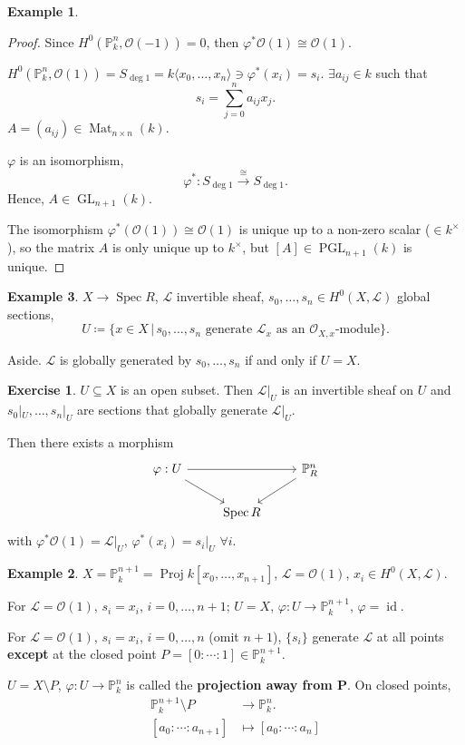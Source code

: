 \documentclass[12pt]{article}
\DeclareMathOperator{\id}{id}
\DeclareMathOperator{\Spec}{Spec}
\DeclareMathOperator{\Proj}{Proj}
\DeclareMathOperator{\GL}{GL}
\DeclareMathOperator{\PGL}{PGL}
\DeclareMathOperator{\Mat}{Mat}
\theoremstyle{definition}
\newtheorem*{exercise}{Exercise}
\newtheorem*{example}{Example}
\theoremstyle{remark}
\begin{document}
\begin{example}
\begin{proof}
Since $H^0(\mathbb{P}_k^n,\mathcal{O}(-1))=0$, then $\varphi^*\mathcal{O}(1)\cong\mathcal{O}(1)$.

$H^0(\mathbb{P}_k^n,\mathcal{O}(1))=S_{\deg1}=k\langle x_0,\ldots,x_n\rangle\ni\varphi^*(x_i)=s_i$. $\exists a_{ij}\in k$ such that
\[s_i=\sum_{j=0}^na_{ij}x_j.\]
$A=(a_{ij})\in\Mat_{n\times n}(k)$.

$\varphi$ is an isomorphism,
\[\varphi^*:S_{\deg1}\overset{\cong}{\longrightarrow}S_{\deg1}.\]
Hence, $A\in\GL_{n+1}(k)$.

The isomorphism $\varphi^*(\mathcal{O}(1))\cong\mathcal{O}(1)$ is unique up to a non-zero scalar ($\in k^{\times}$), so the matrix $A$ is only unique up to $k^{\times}$, but $[A]\in\PGL_{n+1}(k)$ is unique.
\end{proof}
\end{example}

\begin{example}
$X\rightarrow\Spec R$, $\mathcal{L}$ invertible sheaf, $s_0,\ldots,s_n\in H^0(X,\mathcal{L})$ global sections,
\[U\coloneqq\{x\in X\,|\,s_0,\ldots,s_n\text{ generate }\mathcal{L}_x\text{ as an }\mathcal{O}_{X,x}\text{-module}\}.\]

Aside. $\mathcal{L}$ is globally generated by $s_0,\ldots,s_n$ if and only if $U=X$.

\begin{exercise}
$U\subseteq X$ is an open subset. Then $\mathcal{L}|_U$ is an invertible sheaf on $U$ and $s_0|_U,\ldots,s_n|_U$ are sections that globally generate $\mathcal{L}|_U$.

Then there exists a morphism
\[
\begin{tikzcd}
\varphi:U\arrow[rr]\arrow[rd]&&\mathbb{P}_R^n\arrow[ld]\\
&\Spec R
\end{tikzcd}
\]
with $\varphi^*\mathcal{O}(1)=\mathcal{L}|_U$, $\varphi^*(x_i)=s_i|_U$ $\forall i$.
\end{exercise}

\begin{example}
$X=\mathbb{P}_k^{n+1}=\Proj k[x_0,\ldots,x_{n+1}]$, $\mathcal{L}=\mathcal{O}(1)$, $x_i\in H^0(X,\mathcal{L})$.

For $\mathcal{L}=\mathcal{O}(1)$, $s_i=x_i$, $i=0,\ldots,n+1$; $U=X$, $\varphi:U\rightarrow\mathbb{P}_k^{n+1}$, $\varphi=\id$.
\end{example}

For $\mathcal{L}=\mathcal{O}(1)$, $s_i=x_i$, $i=0,\ldots,n$ (omit $n+1$), $\{s_i\}$ generate $\mathcal{L}$ at all points \textbf{except} at the closed point $P=[0:\cdots:1]\in\mathbb{P}_k^{n+1}$.

$U=X\setminus P$, $\varphi:U\rightarrow\mathbb{P}_k^n$ is called the \textbf{projection away from $\boldsymbol{P}$}. On closed points,
\begin{align*}
\mathbb{P}_k^{n+1}\setminus P&\longrightarrow\mathbb{P}_k^n.\\
[a_0:\cdots:a_{n+1}]&\longmapsto[a_0:\cdots:a_n]
\end{align*}
\end{example}
\end{document}
